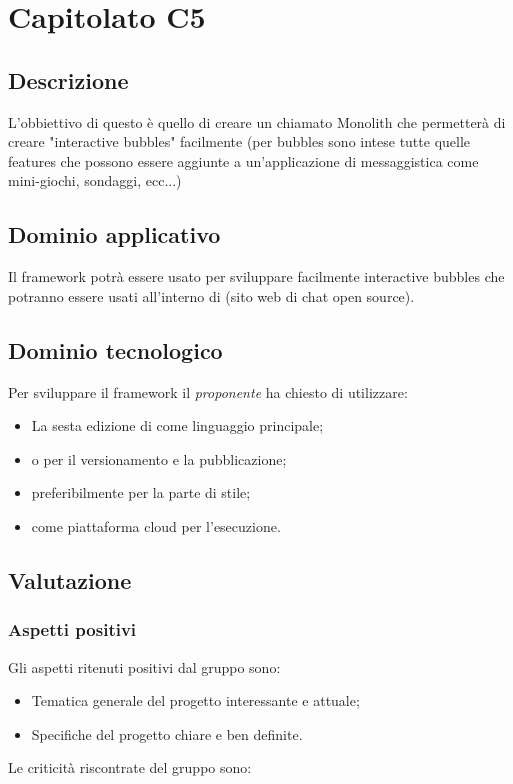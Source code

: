 \documentclass[../StudioDiFattibilita.tex]{subfiles}
\begin{document}
	\section{Capitolato C5}
		\subsection{Descrizione}
		L'obbiettivo di questo  è quello di creare un  chiamato Monolith che permetterà di creare "interactive bubbles" facilmente (per bubbles sono intese tutte quelle features che possono essere aggiunte a un'applicazione di messaggistica come mini-giochi, sondaggi, ecc...)   
		\subsection{Dominio applicativo}
		Il framework potrà essere usato per sviluppare facilmente interactive bubbles che potranno essere usati all'interno di  (sito web di chat open source).
		\subsection{Dominio tecnologico}
		Per sviluppare il framework il \textit{proponente} ha chiesto di utilizzare:
			\begin{itemize}
			\item La sesta edizione di  come linguaggio principale; 
			\item {} o  per il versionamento e la pubblicazione;
			\item {} preferibilmente per la parte di stile;
			\item {} come piattaforma cloud per l'esecuzione.
			\end{itemize}
		\subsection{Valutazione}
			\subsubsection{Aspetti positivi}
			Gli aspetti ritenuti positivi dal gruppo sono:
				\begin{itemize}
				\item Tematica generale del progetto interessante e attuale;
				\item Specifiche del progetto chiare e ben definite.
				\end{itemize}
			Le criticità riscontrate del gruppo sono:	
\end{document}
